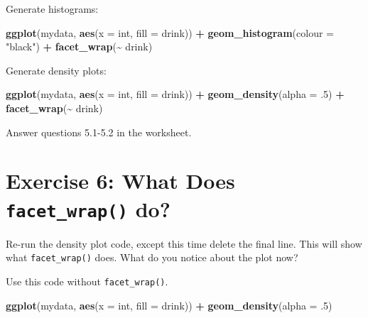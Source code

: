 \documentclass[
]{book}
\newenvironment{Shaded}{\begin{snugshade}}{\end{snugshade}}
\newcommand{\AttributeTok}[1]{\textcolor[rgb]{0.13,0.29,0.53}{#1}}
\newcommand{\DecValTok}[1]{\textcolor[rgb]{0.00,0.00,0.81}{#1}}
\newcommand{\FunctionTok}[1]{\textcolor[rgb]{0.13,0.29,0.53}{\textbf{#1}}}
\newcommand{\NormalTok}[1]{#1}
\newcommand{\SpecialCharTok}[1]{\textcolor[rgb]{0.81,0.36,0.00}{\textbf{#1}}}
\newcommand{\StringTok}[1]{\textcolor[rgb]{0.31,0.60,0.02}{#1}}
\let\oldsection\section
\renewcommand{\section}{\needspace{5\baselineskip}\oldsection}
\begin{document}
Generate histograms:

\begin{Shaded}
\begin{Highlighting}[]
\FunctionTok{ggplot}\NormalTok{(mydata, }\FunctionTok{aes}\NormalTok{(}\AttributeTok{x =}\NormalTok{ int, }\AttributeTok{fill =}\NormalTok{ drink)) }\SpecialCharTok{+}
  \FunctionTok{geom\_histogram}\NormalTok{(}\AttributeTok{colour =} \StringTok{"black"}\NormalTok{) }\SpecialCharTok{+}
  \FunctionTok{facet\_wrap}\NormalTok{(}\SpecialCharTok{\textasciitilde{}}\NormalTok{ drink)}
\end{Highlighting}
\end{Shaded}

Generate density plots:

\begin{Shaded}
\begin{Highlighting}[]
\FunctionTok{ggplot}\NormalTok{(mydata, }\FunctionTok{aes}\NormalTok{(}\AttributeTok{x =}\NormalTok{ int, }\AttributeTok{fill =}\NormalTok{ drink)) }\SpecialCharTok{+}
  \FunctionTok{geom\_density}\NormalTok{(}\AttributeTok{alpha =}\NormalTok{ .}\DecValTok{5}\NormalTok{) }\SpecialCharTok{+}
  \FunctionTok{facet\_wrap}\NormalTok{(}\SpecialCharTok{\textasciitilde{}}\NormalTok{ drink)}
\end{Highlighting}
\end{Shaded}

Answer questions 5.1-5.2 in the worksheet.

\section{\texorpdfstring{Exercise 6: What Does \texttt{facet\_wrap()} do?}{Exercise 6: What Does facet\_wrap() do?}}\label{exercise-6-what-does-facet_wrap-do}

Re-run the density plot code, except this time delete the final line. This will show what \texttt{facet\_wrap()} does. What do you notice about the plot now?

Use this code without \texttt{facet\_wrap()}.

\begin{Shaded}
\begin{Highlighting}[]
\FunctionTok{ggplot}\NormalTok{(mydata, }\FunctionTok{aes}\NormalTok{(}\AttributeTok{x =}\NormalTok{ int, }\AttributeTok{fill =}\NormalTok{ drink)) }\SpecialCharTok{+}
  \FunctionTok{geom\_density}\NormalTok{(}\AttributeTok{alpha =}\NormalTok{ .}\DecValTok{5}\NormalTok{)}
\end{Highlighting}
\end{Shaded}
\end{document}
